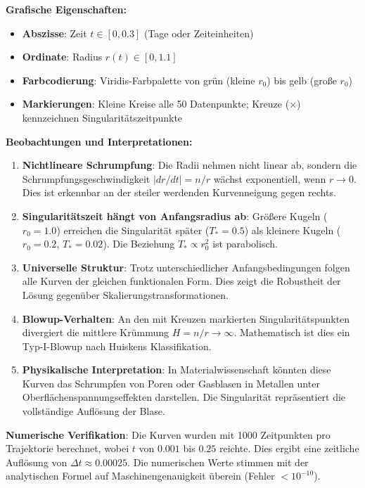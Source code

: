 \documentclass[a4paper,12pt]{article}
\theoremstyle{definition}
\begin{document}
\textbf{Grafische Eigenschaften:}
\begin{itemize}
	\item \textbf{Abszisse}: Zeit $t \in [0, 0.3]$ (Tage oder Zeiteinheiten)
	\item \textbf{Ordinate}: Radius $r(t) \in [0, 1.1]$
	\item \textbf{Farbcodierung}: Viridis-Farbpalette von grün (kleine $r_0$) bis gelb (große $r_0$)
	\item \textbf{Markierungen}: Kleine Kreise alle 50 Datenpunkte; Kreuze (×) kennzeichnen Singularitätszeitpunkte
\end{itemize}

\textbf{Beobachtungen und Interpretationen:}

\begin{enumerate}
	\item \textbf{Nichtlineare Schrumpfung}: Die Radii nehmen nicht linear ab, sondern die Schrumpfungsgeschwindigkeit $|dr/dt| = n/r$ wächst exponentiell, wenn $r \to 0$. Dies ist erkennbar an der steiler werdenden Kurvenneigung gegen rechts.
	
	\item \textbf{Singularitätszeit hängt von Anfangsradius ab}: Größere Kugeln ($r_0 = 1.0$) erreichen die Singularität später ($T_* = 0.5$) als kleinere Kugeln ($r_0 = 0.2$, $T_* = 0.02$). Die Beziehung $T_* \propto r_0^2$ ist parabolisch.
	
	\item \textbf{Universelle Struktur}: Trotz unterschiedlicher Anfangsbedingungen folgen alle Kurven der gleichen funktionalen Form. Dies zeigt die Robustheit der Lösung gegenüber Skalierungstransformationen.
	
	\item \textbf{Blowup-Verhalten}: An den mit Kreuzen markierten Singularitätspunkten divergiert die mittlere Krümmung $H = n/r \to \infty$. Mathematisch ist dies ein Typ-I-Blowup nach Huiskens Klassifikation.
	
	\item \textbf{Physikalische Interpretation}: In Materialwissenschaft könnten diese Kurven das Schrumpfen von Poren oder Gasblasen in Metallen unter Oberflächenspannungseffekten darstellen. Die Singularität repräsentiert die vollständige Auflösung der Blase.
\end{enumerate}

\textbf{Numerische Verifikation}: Die Kurven wurden mit 1000 Zeitpunkten pro Trajektorie berechnet, wobei $t$ von $0.001$ bis $0.25$ reichte. Dies ergibt eine zeitliche Auflösung von $\Delta t \approx 0.00025$. Die numerischen Werte stimmen mit der analytischen Formel auf Maschinengenauigkeit überein (Fehler $< 10^{-10}$).
\end{document}
